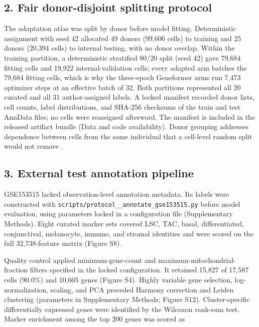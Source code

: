\documentclass[12pt,letterpaper]{article}
\begin{document}
\subsection*{2. Fair donor-disjoint splitting protocol}

The adaptation atlas was split by donor before model fitting. Deterministic assignment with seed 42 allocated 49 donors (99,606 cells) to training and 25 donors (20,394 cells) to internal testing, with no donor overlap. Within the training partition, a deterministic stratified 80/20 split (seed 42) gave 79{,}684 fitting cells and 19{,}922 internal-validation cells; every adapted arm batches the 79{,}684 fitting cells, which is why the three-epoch Geneformer arms run 7{,}473 optimizer steps at an effective batch of 32. Both partitions represented all 20 curated and all 31 author-assigned labels. A locked manifest recorded donor lists, cell counts, label distributions, and SHA-256 checksums of the train and test AnnData files; no cells were reassigned afterward. The manifest is included in the released artifact bundle (Data and code availability). Donor grouping addresses dependence between cells from the same individual that a cell-level random split would not remove \cite{cellleak2026}.

\subsection*{3. External test annotation pipeline}

GSE153515 lacked observation-level annotation metadata. Its labels were constructed with \texttt{scripts/\allowbreak protocol\_\_\allowbreak annotate\_\allowbreak gse153515.py} before model evaluation, using parameters locked in a configuration file (Supplementary Methods). Eight curated marker sets covered LSC, TAC, basal, differentiated, conjunctival, melanocyte, immune, and stromal identities and were scored on the full 32,738-feature matrix (Figure S8).

Quality control applied minimum-gene-count and maximum-mitochondrial-fraction filters specified in the locked configuration. It retained 15,827 of 17,587 cells (90.0\%) and 10,605 genes (Figure S4). Highly variable gene selection, log-normalization, scaling, and PCA preceded Harmony correction \cite{korsunsky2019} and Leiden clustering (parameters in Supplementary Methods; Figure S12). Cluster-specific differentially expressed genes were identified by the Wilcoxon rank-sum test. Marker enrichment among the top 200 genes was scored as
\end{document}

